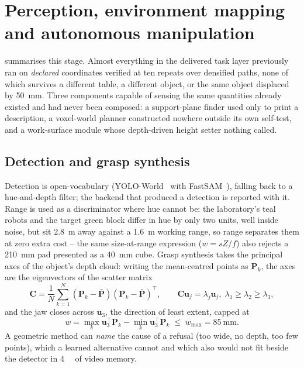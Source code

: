 \chapter{Perception, environment mapping and autonomous manipulation}
\label{ch:perception}

 summarises this stage. Almost everything in the
delivered task layer previously ran on \emph{declared} coordinates verified
at ten repeats over densified paths, none of which survives a different
table, a different object, or the same object displaced by
\SI{50}{\milli\metre}. Three components capable of sensing the same
quantities already existed and had never been composed: a support-plane
finder used only to print a description, a voxel-world planner constructed
nowhere outside its own self-test, and a work-surface module whose
depth-driven height setter nothing called.

\section{Detection and grasp synthesis}

Detection is open-vocabulary (YOLO-World~\cite{cheng2024yoloworld} with
FastSAM~\cite{zhao2023fastsam}), falling back to a hue-and-depth filter; the
backend that produced a detection is reported with it. Range is used as a
discriminator where hue cannot be: the laboratory's teal robots and the
target green block differ in hue by only two units, well inside noise, but
sit \SI{2.8}{\metre} away against a \SI{1.6}{\metre} working range, so range
separates them at zero extra cost -- the same size-at-range expression
($w=sZ/f$) also rejects a \SI{210}{\milli\metre} pad presented as a
\SI{40}{\milli\metre} cube. Grasp synthesis takes the principal axes of the
object's depth cloud: writing the mean-centred points as $\mathbf{P}_k$, the
axes are the eigenvectors of the scatter matrix
\begin{equation}
  \mathbf{C} = \frac{1}{N}\sum_{k=1}^{N}(\mathbf{P}_k-\bar{\mathbf{P}})(\mathbf{P}_k-\bar{\mathbf{P}})^{\!\top},
  \qquad \mathbf{C}\mathbf{u}_j=\lambda_j\mathbf{u}_j,\; \lambda_1\ge\lambda_2\ge\lambda_3,
  \label{eq:pca}
\end{equation}
and the jaw closes across $\mathbf{u}_3$, the direction of least extent,
capped at
\begin{equation}
  w = \max_k \mathbf{u}_3^{\!\top}\mathbf{P}_k - \min_k \mathbf{u}_3^{\!\top}\mathbf{P}_k
  \;\le\; w_{\max} = \SI{85}{\milli\metre}.
  \label{eq:graspwidth}
\end{equation}
A geometric method can \emph{name} the cause of a refusal (too wide, no
depth, too few points), which a learned alternative cannot and which also
would not fit beside the detector in \SI{4}{\gibi\byte} of video memory.

